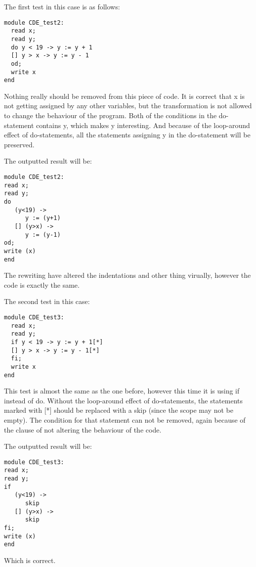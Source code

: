 The first test in this case is as follows:
\begin{lstlisting}
module CDE_test2:
  read x;
  read y;
  do y < 19 -> y := y + 1
  [] y > x -> y := y - 1
  od;
  write x
end
\end{lstlisting}
Nothing really should be removed from this piece of code. It is correct that x is not getting assigned by any other variables, but the transformation is not allowed to change the behaviour of the program. Both of the conditions in the do-statement contains y, which makes y interesting. And because of the loop-around effect of do-statements, all the statements assigning y in the do-statement will be preserved.

The outputted result will be:
\begin{lstlisting}
module CDE_test2:
read x;
read y;
do
   (y<19) ->
      y := (y+1)
   [] (y>x) ->
      y := (y-1)
od;
write (x)
end
\end{lstlisting}
The rewriting have altered the indentations and other thing virually, however the code is exactly the same.

The second test in this case:
\begin{lstlisting}
module CDE_test3:
  read x;
  read y;
  if y < 19 -> y := y + 1[*]
  [] y > x -> y := y - 1[*]
  fi;
  write x
end
\end{lstlisting}
This test is almost the same as the one before, however this time it is using if instead of do. Without the loop-around effect of do-statements, the statements marked with [*] should be replaced with a skip (since the scope may not be empty). The condition for that statement can not be removed, again because of the clause of not altering the behaviour of the code.

The outputted result will be:
\begin{lstlisting}
module CDE_test3:
read x;
read y;
if
   (y<19) ->
      skip
   [] (y>x) ->
      skip
fi;
write (x)
end
\end{lstlisting}
Which is correct.

